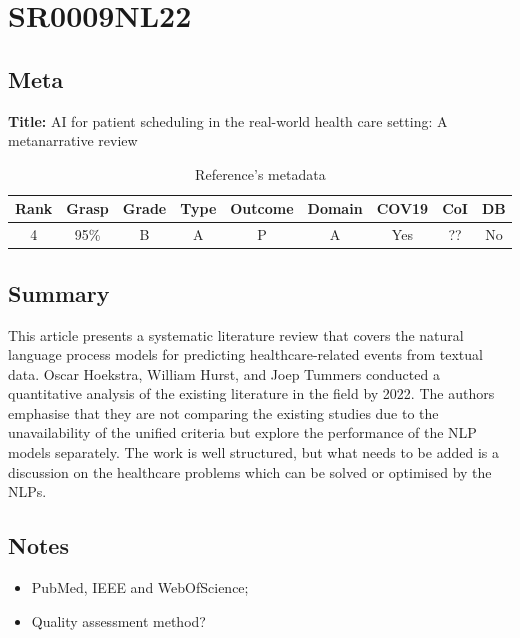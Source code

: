 \section{ SR0009NL22 }


\subsection{Meta}

    \textbf{Title:}
    AI for patient scheduling in the real-world health care setting: A metanarrative review

    \begin{table}[H]
        \centering
        \begin{tabular}{|c|c|c|c|c|c|c|c|c|}
            \hline
                \textbf{Rank} & \textbf{Grasp} & \textbf{Grade} & \textbf{Type} & \textbf{Outcome} & \textbf{Domain} & \textbf{COV19} & \textbf{CoI} & \textbf{DB} \\
            \hline
                4 & 95\% & B & A & P & A & Yes & ?? & No \\
            \hline
        \end{tabular}
        \caption{Reference's metadata}
        \label{tab:SR0009NL22}
    \end{table}

\subsection{Summary}
This article presents a systematic literature review that covers the natural language process models for predicting healthcare-related events from textual data. Oscar Hoekstra, William Hurst, and Joep Tummers conducted a quantitative analysis of the existing literature in the field by 2022. The authors emphasise that they are not comparing the existing studies due to the unavailability of the unified criteria but explore the performance of the NLP models separately. The work is well structured, but what needs to be added is a discussion on the healthcare problems which can be solved or optimised by the NLPs. 
    

\subsection{Notes}
    \begin{itemize}
        \item PubMed, IEEE and WebOfScience;
        \item Quality assessment method?
    \end{itemize}


